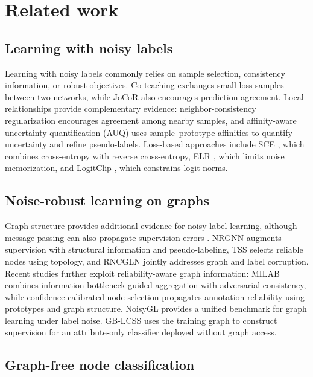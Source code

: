 \documentclass[times,review,10pt]{elsarticle}
\theoremstyle{definition}
\theoremstyle{plain}
\begin{document}
\section{Related work}\label{sec:2}

\subsection{Learning with noisy labels}\label{sec:2.1}

Learning with noisy labels commonly relies on sample selection, consistency information, or robust objectives. Co-teaching \cite{ref17} exchanges small-loss samples between two networks, while JoCoR \cite{ref18} also encourages prediction agreement. Local relationships provide complementary evidence: neighbor-consistency regularization \cite{ref10} encourages agreement among nearby samples, and affinity-aware uncertainty quantification (AUQ) \cite{pr2026auq} uses sample--prototype affinities to quantify uncertainty and refine pseudo-labels. Loss-based approaches include SCE \cite{ref23}, which combines cross-entropy with reverse cross-entropy, ELR \cite{ref24}, which limits noise memorization, and LogitClip \cite{ref26}, which constrains logit norms.

\subsection{Noise-robust learning on graphs}\label{sec:2.2}

Graph structure provides additional evidence for noisy-label learning, although message passing can also propagate supervision errors \cite{ref6}. NRGNN \cite{ref7} augments supervision with structural information and pseudo-labeling, TSS \cite{ref9} selects reliable nodes using topology, and RNCGLN \cite{ref33} jointly addresses graph and label corruption. Recent studies further exploit reliability-aware graph information: MILAB \cite{ref38} combines information-bottleneck-guided aggregation with adversarial consistency, while confidence-calibrated node selection \cite{pr2026llm} propagates annotation reliability using prototypes and graph structure. NoisyGL \cite{ref6} provides a unified benchmark for graph learning under label noise. GB-LCSS uses the training graph to construct supervision for an attribute-only classifier deployed without graph access.

\subsection{Graph-free node classification}\label{sec:2.3}
\end{document}
